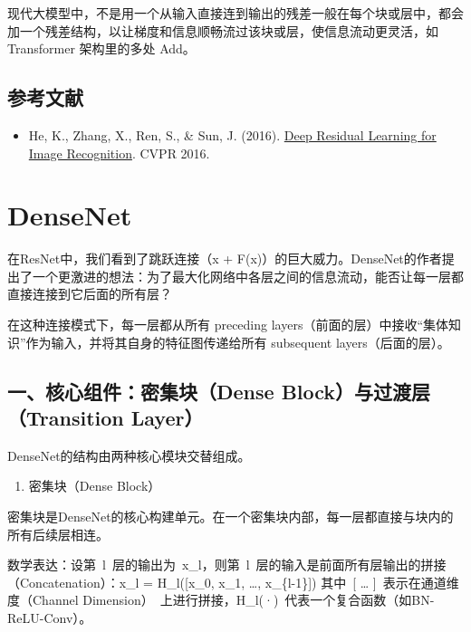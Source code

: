 现代大模型中，不是用一个从输入直接连到输出的残差一般在每个块或层中，都会加一个残差结构，以让梯度和信息顺畅流过该块或层，使信息流动更灵活，如 Transformer 架构里的多处 Add。

\hypertarget{ux53c2ux8003ux6587ux732e-12}{%
\subsection{参考文献}\label{ux53c2ux8003ux6587ux732e-12}}

\begin{itemize}
\tightlist
\item
  He, K., Zhang, X., Ren, S., \& Sun, J. (2016). \href{https://arxiv.org/abs/1512.03385}{Deep Residual Learning for Image Recognition}. CVPR 2016.
\end{itemize}

\clearpage

\hypertarget{densenet}{%
\section{DenseNet}\label{densenet}}

在ResNet中，我们看到了跳跃连接（x + F(x)）的巨大威力。DenseNet的作者提出了一个更激进的想法：为了最大化网络中各层之间的信息流动，能否让每一层都直接连接到它后面的所有层？

在这种连接模式下，每一层都从所有 preceding layers（前面的层）中接收``集体知识''作为输入，并将其自身的特征图传递给所有 subsequent layers（后面的层）。

\hypertarget{ux4e00ux6838ux5fc3ux7ec4ux4ef6ux5bc6ux96c6ux5757dense-blockux4e0eux8fc7ux6e21ux5c42transition-layer}{%
\subsection{一、核心组件：密集块（Dense Block）与过渡层（Transition Layer）}\label{ux4e00ux6838ux5fc3ux7ec4ux4ef6ux5bc6ux96c6ux5757dense-blockux4e0eux8fc7ux6e21ux5c42transition-layer}}

DenseNet的结构由两种核心模块交替组成。

\begin{enumerate}
\def\labelenumi{\arabic{enumi}.}
\tightlist
\item
  密集块（Dense Block）
\end{enumerate}

密集块是DenseNet的核心构建单元。在一个密集块内部，每一层都直接与块内的所有后续层相连。

数学表达：设第~l~层的输出为~x\_l，则第~l~层的输入是前面所有层输出的拼接（Concatenation）：x\_l = H\_l({[}x\_0, x\_1, \ldots, x\_\{l-1\}{]})
其中~{[} \ldots{} {]}~表示在通道维度（Channel Dimension）~上进行拼接，H\_l(·)~代表一个复合函数（如BN-ReLU-Conv）。

